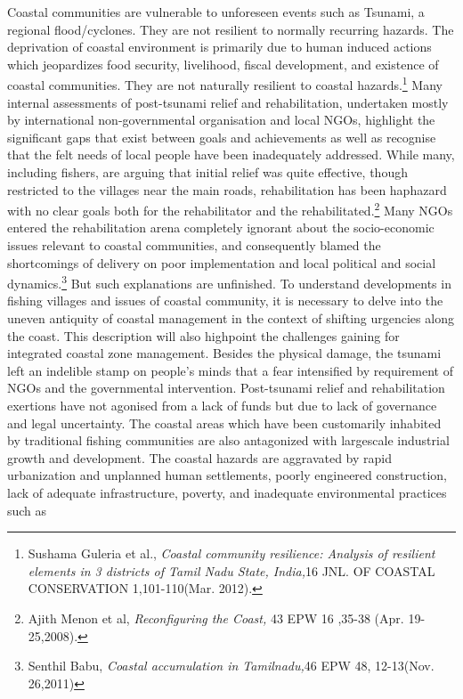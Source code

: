 \begin{multicols}{2}
\noi
Coastal communities are vulnerable to unforeseen events such as Tsunami, a regional
flood/cyclones. They are not resilient to normally recurring hazards. The deprivation of
coastal environment is primarily due to human induced actions which jeopardizes food
security, livelihood, fiscal development, and existence of coastal communities. They are not
naturally resilient to coastal hazards.\footnote{Sushama Guleria et al., \textit{Coastal community resilience: Analysis of resilient elements in 3 districts of Tamil Nadu State, India,}16 JNL. OF COASTAL CONSERVATION 1,101-110(Mar. 2012).} Many internal assessments of post-tsunami relief and
rehabilitation, undertaken mostly by international non-governmental organisation and local
NGOs, highlight the significant gaps that exist between goals and achievements as well as
recognise that the felt needs of local people have been inadequately addressed. While many,
including fishers, are arguing that initial relief was quite effective, though restricted to the
villages near the main roads, rehabilitation has been haphazard with no clear goals both for
the rehabilitator and the rehabilitated.\footnote{Ajith Menon et al, \textit{Reconfiguring the Coast,} 43 EPW 16 ,35-38 (Apr. 19-25,2008).} Many NGOs entered the rehabilitation arena
completely ignorant about the socio-economic issues relevant to coastal communities, and
consequently blamed the shortcomings of delivery on poor implementation and local political
and social dynamics.\footnote{Senthil Babu, \textit{Coastal accumulation in Tamilnadu,}46 EPW 48, 12-13(Nov. 26,2011) } But such explanations are unfinished. To understand developments in
fishing villages and issues of coastal community, it is necessary to delve into the uneven
antiquity of coastal management in the context of shifting urgencies along the coast. This
description will also highpoint the challenges gaining for integrated coastal zone
management. Besides the physical damage, the tsunami left an indelible stamp on people's
minds that a fear intensified by requirement of NGOs and the governmental intervention.
Post-tsunami relief and rehabilitation exertions have not agonised from a lack of funds but
due to lack of governance and legal uncertainty. The coastal areas which have been
customarily inhabited by traditional fishing communities are also antagonized with largescale industrial growth and development. The coastal hazards are aggravated by rapid
urbanization and unplanned human settlements, poorly engineered construction, lack of
adequate infrastructure, poverty, and inadequate environmental practices such as

\end{multicols}
